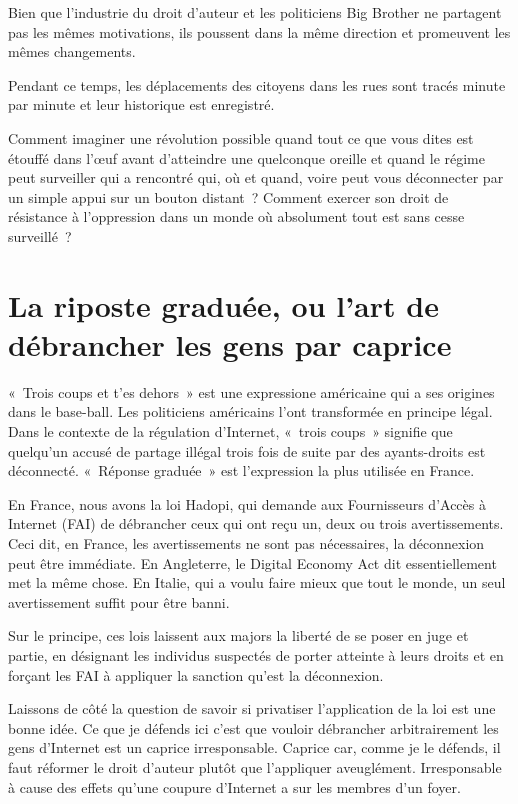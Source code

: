 Bien que l’industrie du droit d’auteur et les politiciens Big Brother ne partagent pas les mêmes
motivations, ils poussent dans la même direction et promeuvent les mêmes changements.

Pendant ce temps, les déplacements des citoyens dans les rues sont tracés minute par minute et leur
historique est enregistré.

Comment imaginer une révolution possible quand tout ce que vous dites est étouffé dans l’œuf avant
d’atteindre une quelconque oreille et quand le régime peut surveiller qui a rencontré qui, où et
quand, voire peut vous déconnecter par un simple appui sur un bouton distant~? Comment exercer son
droit de résistance à l’oppression dans un monde où absolument tout est sans cesse surveillé~?

\section{La riposte graduée, ou l’art de débrancher les gens par caprice}

«~Trois coups et t’es dehors~» est une expressione américaine qui a ses origines dans le
base-ball. Les
politiciens américains l'ont transformée en principe légal. Dans le contexte de la régulation d'Internet,
«~trois coups~» signifie que quelqu’un accusé de partage illégal trois fois de suite par des
ayants-droits est déconnecté. «~Réponse graduée~» est l’expression la plus utilisée en France.

En France, nous avons la loi Hadopi, qui demande aux Fournisseurs d’Accès
à Internet (FAI) de
débrancher ceux qui ont reçu un, deux ou trois avertissements. Ceci dit, en France, les
avertissements ne sont pas nécessaires, la déconnexion peut être immédiate. En Angleterre, le
Digital Economy Act dit essentiellement met la même chose. En Italie, qui a voulu
faire mieux que
tout le monde, un seul
avertissement suffit pour être banni.

Sur le principe, ces lois laissent aux majors la liberté de se poser en juge et partie, en désignant
les individus suspectés de porter atteinte à leurs droits et en forçant les FAI à appliquer la
sanction qu’est la déconnexion.

Laissons de côté la question de savoir si privatiser l’application de la loi est une bonne idée. Ce
que je défends ici c’est que vouloir débrancher arbitrairement les gens d’Internet est un
caprice irresponsable. Caprice car, comme je le défends, il faut réformer le droit d’auteur
plutôt que l’appliquer aveuglément. Irresponsable à cause des effets qu’une coupure d’Internet a sur
les membres d’un foyer.

